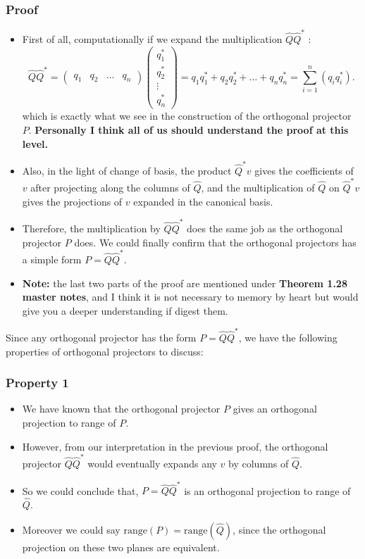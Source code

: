 \subsubsection*{Proof}%
\begin{itemize}
\item First of all, computationally if we expand the multiplication $\hat{Q}\hat{Q}^{*}$ :
  \[
    \hat{Q}\hat{Q}^* = \begin{pmatrix} q_1 & q_2 & \ldots & q_n \end{pmatrix} \begin{pmatrix} q_1^{*}\\ q_2^{*} \\\vdots\\ q_n^{*} \end{pmatrix} = q_1q_1^* + q_2q_2^* + \ldots + q_nq_n^{*} =  \sum_{i=1}^{n} (q_iq_i^{*})
  .\]
  which is exactly what we see in the construction of the orthogonal projector $P$. \textbf{Personally I think all of us should understand the proof at this level.}
\item Also, in the light of change of basis, the product $\hat{Q}^*v$ gives the coefficients of $v$ after projecting along the columns of  $\hat{Q}$, and the multiplication of $\hat{Q}$ on $\hat{Q}^*v$ gives the projections of $v$ expanded in the canonical basis. 
  \item Therefore, the multiplication by $\hat{Q}\hat{Q}^*$ does the same job as the orthogonal projector $P$ does. We could finally confirm that the orthogonal projectors has a simple form  $P  = \hat{Q}\hat{Q}^{*}$. 
  \item \textbf{Note:} the last two parts of the proof are mentioned under \textbf{Theorem 1.28 master notes}, and I think it is not necessary to memory by heart but would give you a deeper understanding if digest them.
\end{itemize}
Since any orthogonal projector has the form $P = \hat{Q}\hat{Q}^*$, we have the following properties of orthogonal projectors to discuss:
\subsubsection*{Property 1}%

\begin{itemize}
\item We have known that the orthogonal projector $P$ gives an orthogonal projection to range of $P$. 
\item However, from our interpretation in the previous proof, the orthogonal projector $\hat{Q}\hat{Q}^*$ would eventually expands any $v$ by columns of $\hat{Q}$. 
\item So we could conclude that, $P = \hat{Q}\hat{Q}^*$ is an orthogonal projection to range of $\hat{Q}$.
\item Moreover we could say $\text{range}(P) = \text{range}(\hat{Q})$, since the orthogonal projection on these two planes are equivalent.
\end{itemize}
